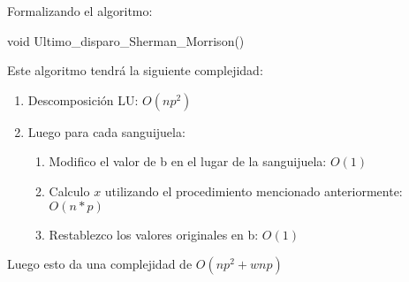 Formalizando el algoritmo:
\begin{algorithm}
\begin{algorithmic}[1]\parskip=1mm
\caption{void Ultimo\_disparo\_Sherman\_Morrison()}
\end{algorithmic}
\end{algorithm}

Este algoritmo tendrá la siguiente complejidad:
\begin{enumerate}
 \item Descomposición LU: $O(np^2)$
 \item Luego para cada sanguijuela:
\begin{enumerate}
\item Modifico el valor de b en el lugar de la sanguijuela: $O(1)$
\item Calculo $x$ utilizando el procedimiento mencionado anteriormente: $O(n*p)$
\item Restablezco los valores originales en b: $O(1)$
\end{enumerate}  
\end{enumerate}
Luego esto da una complejidad de $O(np^2 + wnp)$



